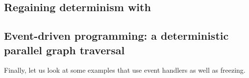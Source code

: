 
\singlespacing

\doublespacing

\subsection{Regaining determinism with }


\singlespacing

\doublespacing

\subsection{Event-driven programming: a deterministic parallel graph traversal}

Finally, let us look at some examples that use event handlers as well
as freezing.

\singlespacing

\doublespacing

\singlespacing

\doublespacing

